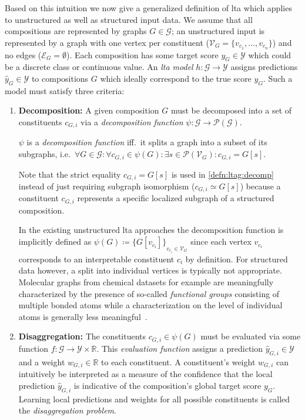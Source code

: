 Based on this intuition we now give a generalized definition of \ac{lta} which applies to unstructured as well as structured input data.
We assume that all compositions are represented by graphs $G \in \mathcal{G}$;
an unstructured input is represented by a graph with one vertex per constituent ($\mathcal{V}_G = \{ v_{c_1}, \dots, v_{c_n} \}$) and no edges ($\mathcal{E}_G = \emptyset$).
Each composition has some target score $y_G \in \mathcal{Y}$ which could be a discrete class or continuous value.
An \textit{\ac{lta} model} $h: \mathcal{G} \to \mathcal{Y}$ assigns predictions $\hat{y}_G \in \mathcal{Y}$ to compositions $G$ which ideally correspond to the true score $y_G$.
Such a model must satisfy three criteria:
\begin{enumerate}[label=\textbf{\arabic*.}]
	\item \textbf{Decomposition:}
		A given composition $G$ must be decomposed into a set of constituents $c_{G,i}$ via a \textit{decomposition function} $\psi: \mathcal{G} \to \mathcal{P}(\mathcal{G})$.
		\begin{defn}\label{defn:ltag:decomp}
			$\psi$ is a \textit{decomposition function} iff.\ it splits a graph into a subset of its subgraphs, i.e.\ $\forall G \in \mathcal{G}: \forall c_{G,i} \in \psi(G): \exists s \in \mathcal{P}(\mathcal{V}_G): c_{G,i} = G[s]$.
		\end{defn}
		Note that the strict equality $c_{G,i} = G[s]$ is used in \cref{defn:ltag:decomp} instead of just requiring subgraph isomorphism ($c_{G,i} \simeq G[s]$) because a constituent $c_{G,i}$ represents a specific localized subgraph of a structured composition.

		In the existing unstructured \ac{lta} approaches the decomposition function is implicitly defined as $\psi(G) \coloneqq {\{ G[v_{c_i}] \}}_{v_{c_i} \in \mathcal{V}_G}$ since each vertex $v_{c_i}$ corresponds to an interpretable constituent $c_i$ by definition.
		For structured data however, a split into individual vertices is typically not appropriate.
		Molecular graphs from chemical datasets for example are meaningfully characterized by the presence of so-called \textit{functional groups} consisting of multiple bonded atoms while a characterization on the level of individual atoms is generally less meaningful~\cite{McNaught1997}.
	\item \textbf{Disaggregation:}
		The constituents $c_{G, i} \in \psi(G)$ must be evaluated via some function $f: \mathcal{G} \to \mathcal{Y} \times \mathbb{R}$.
		This \textit{evaluation function} assigns a prediction $\hat{y}_{G, i} \in \mathcal{Y}$ and a weight $w_{G, i} \in \mathbb{R}$ to each constituent.
		A constituent's weight $w_{G, i}$ can intuitively be interpreted as a measure of the confidence that the local prediction $\hat{y}_{G, i}$ is indicative of the composition's global target score $y_G$.
		Learning local predictions and weights for all possible constituents is called the \textit{disaggregation problem}.


\end{enumerate}
